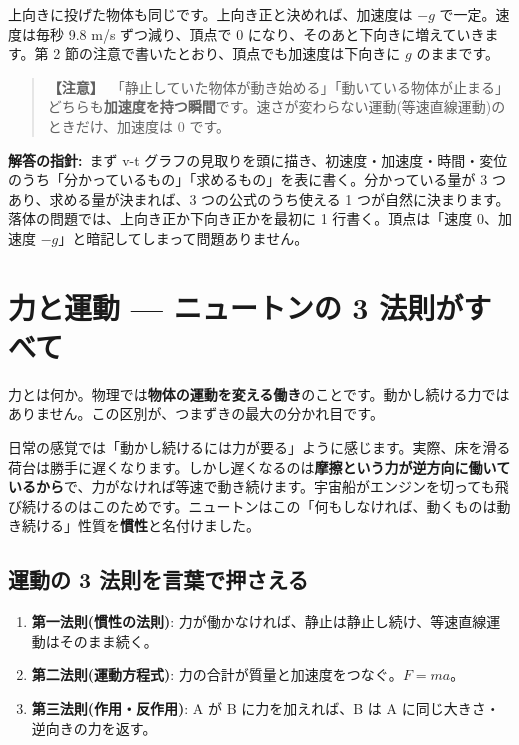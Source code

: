 \documentclass{article}
\begin{document}
上向きに投げた物体も同じです。上向き正と決めれば、加速度は \( -g \) で一定。速度は毎秒 9.8 m/s ずつ減り、頂点で 0 になり、そのあと下向きに増えていきます。第 2 節の注意で書いたとおり、頂点でも加速度は下向きに \( g \) のままです。

\begin{quote}
\textbf{【注意】}\ 「静止していた物体が動き始める」「動いている物体が止まる」どちらも\textbf{加速度を持つ瞬間}です。速さが変わらない運動(等速直線運動)のときだけ、加速度は 0 です。
\end{quote}

\textbf{解答の指針:}\ まず v-t グラフの見取りを頭に描き、初速度・加速度・時間・変位のうち「分かっているもの」「求めるもの」を表に書く。分かっている量が 3 つあり、求める量が決まれば、3 つの公式のうち使える 1 つが自然に決まります。落体の問題では、上向き正か下向き正かを最初に 1 行書く。頂点は「速度 0、加速度 \( -g \)」と暗記してしまって問題ありません。

\section{力と運動 — ニュートンの 3 法則がすべて}

力とは何か。物理では\textbf{物体の運動を変える働き}のことです。動かし続ける力ではありません。この区別が、つまずきの最大の分かれ目です。

日常の感覚では「動かし続けるには力が要る」ように感じます。実際、床を滑る荷台は勝手に遅くなります。しかし遅くなるのは\textbf{摩擦という力が逆方向に働いているから}で、力がなければ等速で動き続けます。宇宙船がエンジンを切っても飛び続けるのはこのためです。ニュートンはこの「何もしなければ、動くものは動き続ける」性質を\textbf{慣性}と名付けました。

\subsection{運動の 3 法則を言葉で押さえる}

\begin{enumerate}
\item \textbf{第一法則(慣性の法則)}: 力が働かなければ、静止は静止し続け、等速直線運動はそのまま続く。
\item \textbf{第二法則(運動方程式)}: 力の合計が質量と加速度をつなぐ。\( F = ma \)。
\item \textbf{第三法則(作用・反作用)}: A が B に力を加えれば、B は A に同じ大きさ・逆向きの力を返す。
\end{enumerate}
\end{document}
